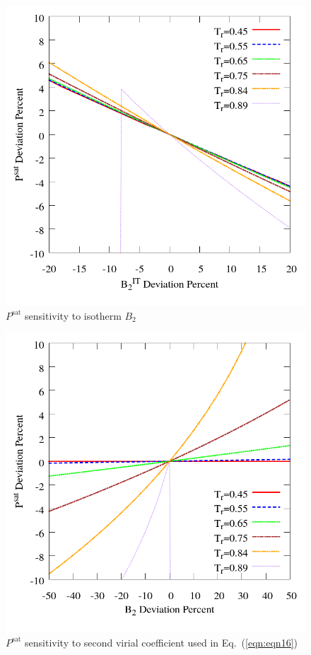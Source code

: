 \documentclass[5p,times]{elsarticle}
\begin{document}
\begin{figure}
\includegraphics[scale=0.30]{Figures/FTF-B2xX-IT-C12-Psat.png}
\caption{$P^{\mathrm{sat}}$ sensitivity to isotherm $B_2$}
\label{fig:FTF-B2xX-IT-C12-Psat}
\end{figure}


\begin{figure}
\includegraphics[scale=0.30]{Figures/FTF-B2xX-C12-Psat.png}
\caption{$P^{\mathrm{sat}}$ sensitivity to second virial coefficient used in Eq.~(\ref{eqn:eqn16})}
\label{fig:FTF-B2xX-C12-Psat}
\end{figure}
\end{document}
